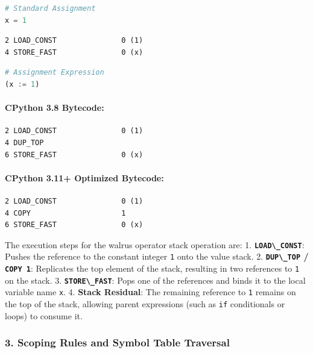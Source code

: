 \begin{lstlisting}[language=Python]
# Standard Assignment
x = 1
\end{lstlisting}

\begin{lstlisting}
2 LOAD_CONST               0 (1)
4 STORE_FAST               0 (x)
\end{lstlisting}

\begin{lstlisting}[language=Python]
# Assignment Expression
(x := 1)
\end{lstlisting}

\hypertarget{cpython-3.8-bytecode}{%
\paragraph{CPython 3.8 Bytecode:}\label{cpython-3.8-bytecode}}

\begin{lstlisting}
2 LOAD_CONST               0 (1)
4 DUP_TOP
6 STORE_FAST               0 (x)
\end{lstlisting}

\hypertarget{cpython-3.11-optimized-bytecode}{%
\paragraph{CPython 3.11+ Optimized
Bytecode:}\label{cpython-3.11-optimized-bytecode}}

\begin{lstlisting}
2 LOAD_CONST               0 (1)
4 COPY                     1
6 STORE_FAST               0 (x)
\end{lstlisting}

The execution steps for the walrus operator stack operation are: 1.
\textbf{\passthrough{\lstinline!LOAD\_CONST!}}: Pushes the reference to
the constant integer \passthrough{\lstinline!1!} onto the value stack.
2. \textbf{\passthrough{\lstinline!DUP\_TOP!} /
\passthrough{\lstinline!COPY 1!}}: Replicates the top element of the
stack, resulting in two references to \passthrough{\lstinline!1!} on the
stack. 3. \textbf{\passthrough{\lstinline!STORE\_FAST!}}: Pops one of
the references and binds it to the local variable name
\passthrough{\lstinline!x!}. 4. \textbf{Stack Residual}: The remaining
reference to \passthrough{\lstinline!1!} remains on the top of the
stack, allowing parent expressions (such as \passthrough{\lstinline!if!}
conditionals or loops) to consume it.

\hypertarget{scoping-rules-and-symbol-table-traversal}{%
\subsubsection{3. Scoping Rules and Symbol Table
Traversal}\label{scoping-rules-and-symbol-table-traversal}}

